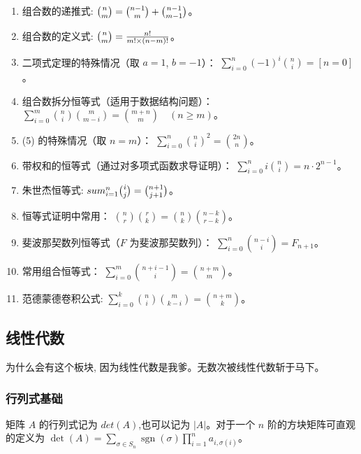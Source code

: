 \documentclass[a4paper,12pt]{article}
\begin{document}
\begin{enumerate} 
    \item 组合数的递推式: 
    \(
    \tbinom{n}{m} = \tbinom{n-1}{m} + \tbinom{n-1}{m-1}
    \)。
    \item 组合数的定义式: 
    \(
    \tbinom{n}{m} = \frac{n!}{m! \times (n-m)!}
    \)。
    \item 二项式定理的特殊情况（取 \( a = 1 \), \( b = -1 \)）：
    \(
    \sum_{i=0}^{n} (-1)^i \binom{n}{i} = [n = 0]
    \)。
    \item 组合数拆分恒等式（适用于数据结构问题）：
    \(
    \sum_{i=0}^{m} \binom{n}{i} \binom{m}{m-i} = \binom{m+n}{m} \quad (n \geq m)
    \)。
    \item (5) 的特殊情况（取 \( n = m \)）：
    \(
    \sum_{i=0}^{n} \binom{n}{i}^2 = \binom{2n}{n}
    \)。
    \item 带权和的恒等式（通过对多项式函数求导证明）：
    \(
    \sum_{i=0}^{n} i \binom{n}{i} = n \cdot 2^{n-1}
    \)。
    \item 朱世杰恒等式: 
    \(
    sum_{i=1}^{n} \tbinom{i}{j} = \tbinom{n+1}{j+1}
    \)。
    \item 恒等式证明中常用：
    \(
    \binom{n}{r} \binom{r}{k} = \binom{n}{k} \binom{n-k}{r-k}
    \)。
    \item 斐波那契数列恒等式（\( F \) 为斐波那契数列）：
    \(
    \sum_{i=0}^{n} \binom{n-i}{i} = F_{n+1}
    \)。
    \item 常用组合恒等式：
    \(
    \sum_{i=0}^{m} \binom{n+i-1}{i} = \binom{n+m}{m}
    \)。
    \item 范德蒙德卷积公式:
    \(
    \sum_{i=0}^k \binom{n}{i} \binom{m}{k-i} = \binom{n+m}{k}
    \)。
\end{enumerate}

\subsection{线性代数}
\noindent 为什么会有这个板块, 因为线性代数是我爹。无数次被线性代数斩于马下。

\subsubsection{行列式基础}

\noindent 矩阵 $A$ 的行列式记为 $det(A)$,也可以记为 $|A|$。对于一个 $n$ 阶的方块矩阵可直观的定义为
$\det(A) = \sum_{\sigma \in S_n} \operatorname{sgn}(\sigma) \prod_{i=1}^n a_{i,\sigma(i)}$。\\
\end{document}

